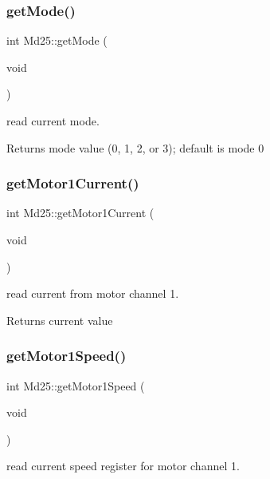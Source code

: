 \subsubsection{\texorpdfstring{get\+Mode()}{getMode()}}
{\footnotesize\ttfamily int Md25\+::get\+Mode (\begin{DoxyParamCaption}\item[{void}]{ }\end{DoxyParamCaption})}



read current mode. 

\begin{DoxyReturn}{Returns}
mode value (0, 1, 2, or 3); default is mode 0 
\end{DoxyReturn}
\mbox{\label{classMd25_a1535d2b845905df746a4e1e3620d7cfb}} 
\subsubsection{\texorpdfstring{get\+Motor1\+Current()}{getMotor1Current()}}
{\footnotesize\ttfamily int Md25\+::get\+Motor1\+Current (\begin{DoxyParamCaption}\item[{void}]{ }\end{DoxyParamCaption})}



read current from motor channel 1. 

\begin{DoxyReturn}{Returns}
current value 
\end{DoxyReturn}
\mbox{\label{classMd25_a630e4aebcbee4178b5ce5a7044f8f2ce}} 
\subsubsection{\texorpdfstring{get\+Motor1\+Speed()}{getMotor1Speed()}}
{\footnotesize\ttfamily int Md25\+::get\+Motor1\+Speed (\begin{DoxyParamCaption}\item[{void}]{ }\end{DoxyParamCaption})}



read current speed register for motor channel 1. 

